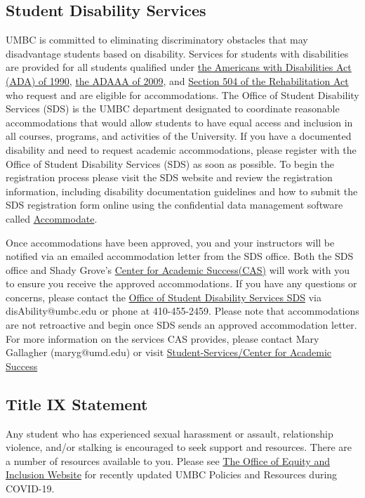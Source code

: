 \documentclass[11pt]{article}
\begin{document}
\subsection*{Student Disability Services}

UMBC is committed to eliminating discriminatory obstacles that may disadvantage students based on disability. Services for students with disabilities are provided for all students qualified under \href{https://en.wikipedia.org/wiki/Americans_with_Disabilities_Act_of_1990}{the Americans with Disabilities Act (ADA) of 1990}, \href{https://en.wikipedia.org/wiki/ADA_Amendments_Act_of_2008}{the ADAAA of 2009}, and \href{https://en.wikipedia.org/wiki/Section_504_of_the_Rehabilitation_Act}{Section 504 of the Rehabilitation Act} who request and are eligible for accommodations. The Office of Student Disability Services (SDS) is the UMBC department designated to coordinate reasonable accommodations that would allow students to have equal access and inclusion in all courses, programs, and activities of the University.
If you have a documented disability and need to request academic accommodations, please register with the Office of Student Disability Services (SDS) as soon as possible. To begin the registration process please visit the SDS website and review the registration information, including disability documentation guidelines and how to submit the SDS registration form online using the confidential data management software called \href{https://sds.umbc.edu/accommodations/registering-with-sds/}{Accommodate}. 

Once accommodations have been approved, you and your instructors will be notified via an emailed accommodation letter from the SDS office.  Both the SDS office and Shady Grove's \href{https://shadygrove.umd.edu/student-services/center-for-academic-success}{Center for Academic Success(CAS)} will work with you to ensure you receive the approved accommodations. If you have any questions or concerns, please contact the \href{https://sds.umbc.edu/}{Office of Student Disability Services SDS} via disAbility@umbc.edu or phone at 410-455-2459. Please note that accommodations are not retroactive and begin once SDS sends an approved accommodation letter.
For more information on the services CAS provides, please contact Mary Gallagher (maryg@umd.edu) or visit \href{https://shadygrove.umd.edu/student-services/center-for-academic-success}{Student-Services/Center for  Academic Success}

\subsection*{Title IX Statement}
Any student who has experienced sexual harassment or assault, relationship violence, and/or stalking is encouraged to seek support and resources. There are a number of resources available to you. Please see \href{https://oei.umbc.edu/sample-title-ix-responsible-employee-syllabus-language/}{The Office of Equity and Inclusion Website} for recently updated UMBC Policies and Resources during COVID-19.
\end{document}
